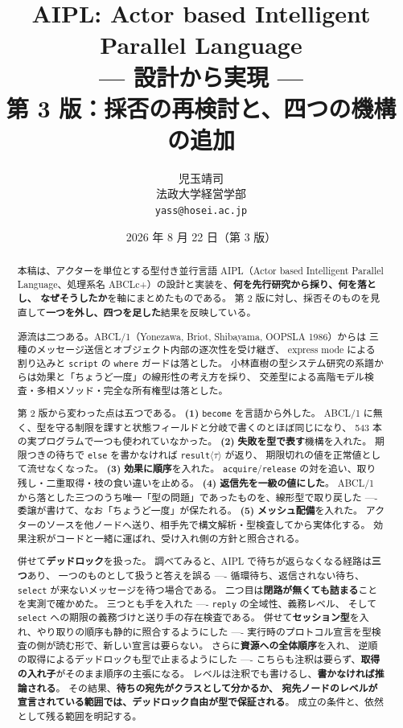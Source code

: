 \documentclass[11pt,a4paper]{ltjsarticle}
\title{\bfseries AIPL: Actor based Intelligent Parallel Language\\[2mm]
       \large --- 設計から実現 ---\\[1mm]
       \normalsize 第 3 版：採否の再検討と、四つの機構の追加}
\author{児玉靖司\\\small 法政大学経営学部\\\small \texttt{yass@hosei.ac.jp}}
\date{2026 年 8 月 22 日（第 3 版）}
\theoremstyle{definition}
\theoremstyle{remark}
\begin{document}
\maketitle

\begin{abstract}
本稿は、アクターを単位とする型付き並行言語 AIPL（Actor based Intelligent Parallel
Language、処理系名 ABCLc+）の設計と実装を、\textbf{何を先行研究から採り、何を落とし、
なぜそうしたか}を軸にまとめたものである。
第 2 版に対し、採否そのものを見直して\textbf{一つを外し、四つを足した}結果を反映している。

源流は二つある。ABCL/1（Yonezawa, Briot, Shibayama, OOPSLA 1986）からは
三種のメッセージ送信とオブジェクト内部の逐次性を受け継ぎ、
express mode による割り込みと \texttt{script} の \texttt{where} ガードは落とした。
小林直樹の型システム研究の系譜からは効果と「ちょうど一度」の線形性の考え方を採り、
交差型による高階モデル検査・多相メソッド・完全な所有権型は落とした。

第 2 版から変わった点は五つである。
\textbf{(1)} \texttt{become} を言語から外した。
ABCL/1 に無く、型を守る制限を課すと状態フィールドと分岐で書くのとほぼ同じになり、
543 本の実プログラムで一つも使われていなかった。
\textbf{(2)} \textbf{失敗を型で表す}機構を入れた。
期限つきの待ちで \texttt{else} を書かなければ \texttt{result}$\langle\tau\rangle$ が返り、
期限切れの値を正常値として流せなくなった。
\textbf{(3)} \textbf{効果に順序}を入れた。
\texttt{acquire}/\texttt{release} の対を追い、取り残し・二重取得・枝の食い違いを止める。
\textbf{(4)} \textbf{返信先を一級の値にした}。
ABCL/1 から落とした三つのうち唯一「型の問題」であったものを、線形型で取り戻した ----
委譲が書けて、なお「ちょうど一度」が保たれる。
\textbf{(5)} \textbf{メッシュ配備}を入れた。
アクターのソースを他ノードへ送り、相手先で構文解析・型検査してから実体化する。
効果注釈がコードと一緒に運ばれ、受け入れ側の方針と照合される。

併せて\textbf{デッドロック}を扱った。
調べてみると、AIPL で待ちが返らなくなる経路は\textbf{三つ}あり、
一つのものとして扱うと答えを誤る ----
循環待ち、返信されない待ち、\texttt{select} が来ないメッセージを待つ場合である。
二つ目は\textbf{閉路が無くても詰まる}ことを実測で確かめた。
三つとも手を入れた ---- \texttt{reply} の全域性、義務レベル、
そして \texttt{select} への期限の義務づけと送り手の存在検査である。
併せて\textbf{セッション型}を入れ、やり取りの順序も静的に照合するようにした ----
実行時のプロトコル宣言を型検査の側が読む形で、新しい宣言は要らない。
さらに\textbf{資源への全体順序}を入れ、
逆順の取得によるデッドロックも型で止まるようにした ----
こちらも注釈は要らず、\textbf{取得の入れ子}がそのまま順序の主張になる。
レベルは注釈でも書けるし、\textbf{書かなければ推論される}。
その結果、\textbf{待ちの宛先がクラスとして分かるか、
宛先ノードのレベルが宣言されている範囲では、デッドロック自由が型で保証される}。
成立の条件と、依然として残る範囲を明記する。


\end{abstract}
\end{document}
